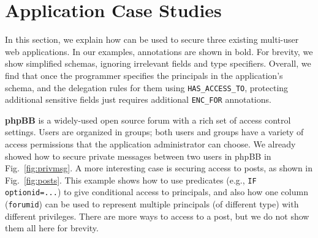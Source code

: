 
\section{Application Case Studies}
\label{s:apps}

In this section, we explain how \name can be used to secure three
existing multi-user web applications.  In our examples, annotations
are shown in bold.  For brevity, we show simplified schemas, ignoring
irrelevant fields and type specifiers.  Overall, we find that once the
programmer specifies the principals in the application's schema, and
the delegation rules for them using {\small \tt HAS\_ACCESS\_TO},
protecting additional sensitive fields just requires additional
{\small \tt ENC\_FOR} annotations.

{\bf phpBB} is a widely-used open source forum with a rich set of
access control settings. Users are organized in groups; both users and
groups have a variety of access permissions that the application
administrator can choose. We already showed how to secure private
messages between two users in phpBB in Fig.~\ref{fig:privmsg}.  A more
interesting case is securing access to posts, as shown in
Fig.~\ref{fig:posts}.  This example shows how to use predicates
(e.g., {\small \tt IF optionid=...}) to give conditional access to
principals, and also how one column ({\tt forumid}) can be used to
represent multiple principals (of different type) with different
privileges.  There are more ways to access to a post, but we do not
show them all here for brevity.


